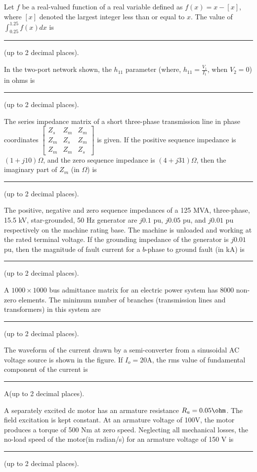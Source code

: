     \item Let $f$ be a real-valued function of a real variable defined as $f(x)=x-[x]$, where $[x]$ denoted the largest integer less than or equal to $x$. The value of $\int_{0.25}^{1.25} f(x)dx$ is \rule{2cm}{0.4pt}(up to 2 decimal places).
    
    \item In the two-port network shown, the $h_{11}$ parameter (where, $h_{11}=\frac{V_1}{I_1}$, when $V_2=0$) in ohms is \rule{2.5cm}{0.4pt}(up to 2 decimal places).
    
    
    \item The series impedance matrix of a short three-phase transmission line in phase coordinates
$
\begin{bmatrix}
Z_s & Z_m & Z_m \\
Z_m & Z_s & Z_m \\
Z_m & Z_m & Z_s 
\end{bmatrix}
$
is given. If the positive sequence impedance is $ (1 + j10) \Omega $, and the zero sequence impedance is $ (4 + j31) \Omega$, then the imaginary part of $ Z_m $ (in $ \Omega $) is \rule{2.5cm}{0.4pt} (up to 2 decimal places).

\item The positive, negative and zero sequence impedances of a 125 MVA, three-phase, 15.5 kV, star-grounded, 50 Hz generator are $ j0.1 $ pu, $ j0.05 $ pu, and $ j0.01 $ pu respectively on the machine rating base. The machine is unloaded and working at the rated terminal voltage. If the grounding impedance of the generator is $ j0.01 $ pu, then the magnitude of fault current for a $ b $-phase to ground fault (in kA) is \rule{2cm}{0.4pt} (up to 2 decimal places).

\item A $ 1000 \times 1000$ bus admittance matrix for an electric power system has 8000 non-zero elements. The minimum number of branches (transmission lines and transformers) in this system are \rule{2cm}{0.4pt}(up to 2 decimal places).

\item The waveform of the current drawn by a semi-converter from a sinusoidal AC voltage source is shown in the figure. If $I_o=20$A, the rms value of fundamental component of the current is \rule{2cm}{0.4pt}A(up to 2 decimal places).


\item A separately excited dc motor has an armature resistance $R_a=0.05\ohm$. The field excitation is kept constant. At an armature voltage of 100V, the motor produces a torque of 500 Nm at zero speed. Neglecting all mechanical losses, the no-load speed of the motor(in radian/s) for an armature voltage of 150 V is \rule{2cm}{0.4pt}(up to 2 decimal places).

